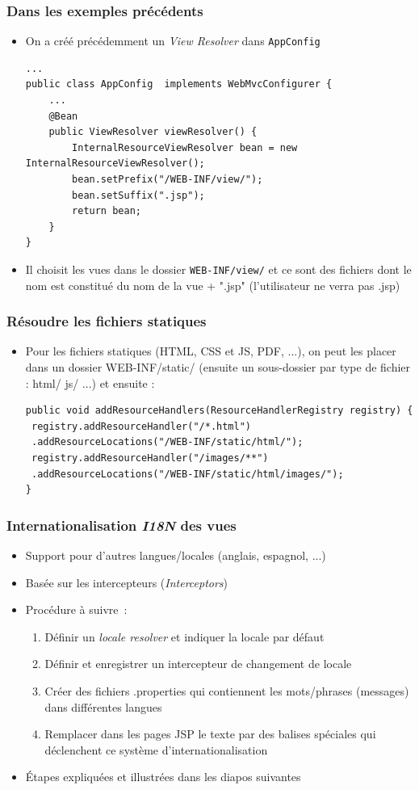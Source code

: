 \documentclass{beamer}
\begin{document}
\begin{frame}[fragile]
	\frametitle{Dans les exemples précédents}
	\begin{itemize}
		\item On a créé précédemment un \textit{View Resolver} dans \texttt{AppConfig}

\begin{lstlisting}
...
public class AppConfig  implements WebMvcConfigurer {	
	...
	@Bean
	public ViewResolver viewResolver() {
		InternalResourceViewResolver bean = new InternalResourceViewResolver();		
		bean.setPrefix("/WEB-INF/view/");
		bean.setSuffix(".jsp");		
		return bean;
	}
}
\end{lstlisting}
\item Il choisit les vues dans le dossier \texttt{WEB-INF/view/} et ce sont des fichiers dont le nom est constitué du nom de la vue + ".jsp" (l'utilisateur ne verra pas .jsp)
	\end{itemize}
\end{frame} 

\begin{frame}[fragile]
	\frametitle{Résoudre les fichiers statiques}
	\begin{itemize}
		\item Pour les fichiers statiques (HTML, CSS et JS, PDF, ...), on peut les placer dans un dossier WEB-INF/static/ (ensuite un sous-dossier par type de fichier : html/ js/ ...) et ensuite :
\begin{lstlisting}
public void addResourceHandlers(ResourceHandlerRegistry registry) {
 registry.addResourceHandler("/*.html")
 .addResourceLocations("/WEB-INF/static/html/");
 registry.addResourceHandler("/images/**")
 .addResourceLocations("/WEB-INF/static/html/images/");
}
\end{lstlisting}		
	\end{itemize}
\end{frame} 

\begin{frame}
	\frametitle{Internationalisation \textit{I18N} des vues}
	\begin{itemize}
		\item Support pour d'autres langues/locales (anglais, espagnol, ...)
		\item Basée sur les intercepteurs (\textit{Interceptors})
		\item Procédure à suivre~:
		\begin{enumerate}
			\item Définir un \textit{locale resolver} et indiquer la locale par défaut
			\item Définir et enregistrer un intercepteur de changement de locale
			\item Créer des fichiers .properties qui contiennent les mots/phrases (messages) dans différentes langues
			\item Remplacer dans les pages JSP le texte par des balises spéciales qui déclenchent ce système d'internationalisation
		\end{enumerate}
		\item Étapes expliquées et illustrées dans les diapos suivantes
	\end{itemize}
\end{frame} 
\end{document}
